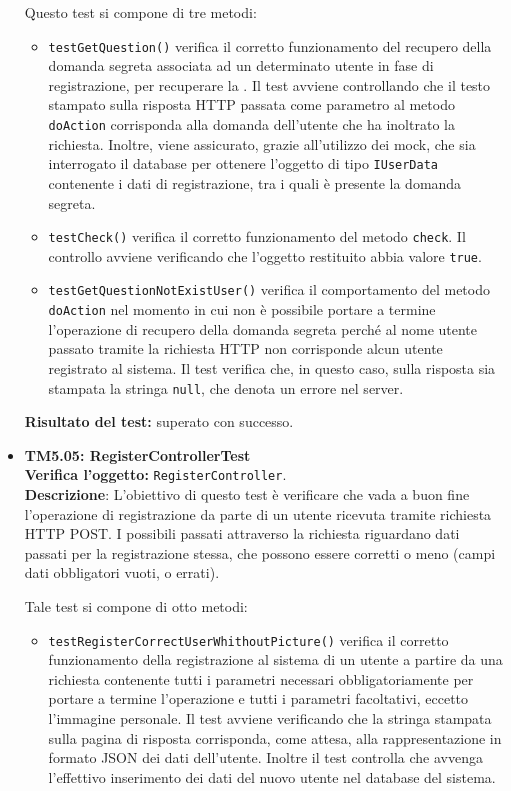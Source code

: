 \begin{itemize}
Questo test si compone di tre metodi:
\begin{itemize}

\item \texttt{testGetQuestion()} verifica il corretto funzionamento del recupero della domanda segreta associata ad un determinato utente in fase di registrazione, per recuperare la .
Il test avviene controllando che il testo stampato sulla risposta HTTP passata come parametro al metodo \texttt{doAction} corrisponda alla domanda dell'utente che ha inoltrato la richiesta. Inoltre, viene assicurato, grazie all'utilizzo dei mock, che sia interrogato il database per ottenere l'oggetto di tipo \texttt{IUserData} contenente i dati di registrazione, tra i quali è presente la domanda segreta. 

\item \texttt{testCheck()} verifica il corretto funzionamento del metodo \texttt{check}. Il controllo avviene verificando che l'oggetto restituito abbia valore \texttt{true}.

\item \texttt{testGetQuestionNotExistUser()} verifica il comportamento del metodo \texttt{doAction} nel momento in cui non è possibile portare a termine l'operazione di recupero della domanda segreta perché al nome utente passato tramite la richiesta HTTP non corrisponde alcun utente registrato al sistema. Il test verifica che, in questo caso, sulla risposta sia stampata la stringa \texttt{null}, che denota un errore nel server.
 
\end{itemize}

\textbf{Risultato del test:} superato con successo.

\item \textbf{TM5.05: RegisterControllerTest}\\
\textbf{Verifica l'oggetto:} \texttt{RegisterController}.\\
\textbf{Descrizione}: L'obiettivo di questo test è verificare che vada a buon fine l'operazione di registrazione da parte di un utente ricevuta tramite richiesta HTTP POST\@. I possibili  passati attraverso la richiesta riguardano dati passati per la registrazione stessa, che possono essere corretti o meno (campi dati obbligatori vuoti, o errati).

Tale test si compone di otto metodi:
\begin{itemize}
\item \texttt{testRegisterCorrectUserWhithoutPicture()} verifica il corretto funzionamento della registrazione al sistema di un utente a partire da una richiesta contenente tutti i parametri necessari obbligatoriamente per portare a termine l'operazione e tutti i parametri facoltativi, eccetto l'immagine personale. Il test avviene verificando che la stringa stampata sulla pagina di risposta corrisponda, come attesa, alla rappresentazione in formato JSON dei dati dell'utente. Inoltre il test controlla che avvenga l'effettivo inserimento dei dati del nuovo utente nel database del sistema.


\end{itemize}
\end{itemize}

